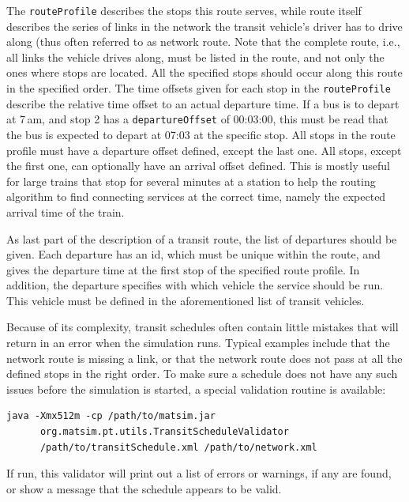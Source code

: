 The \lstinline|routeProfile| describes the stops this route serves, while route itself describes the series of links in the network the transit vehicle's driver has to drive along (thus often referred to as network route. Note that the complete route, i.e.,\,all links the vehicle drives along, must be listed in the route, and not only the ones where stops are located. All the specified stops should occur along this route in the specified order. The time offsets given for each stop in the \lstinline|routeProfile| describe the relative time offset to an actual departure time. If a bus is to depart at 7\,am, and stop 2 has a \lstinline|departureOffset| of 00:03:00, this must be read that the bus is expected to depart at 07:03 at the specific stop. All stops in the route profile must have a departure offset defined, except the last one. All stops, except the first one, can optionally have an arrival offset defined. This is mostly useful for large trains that stop for several minutes at a station to help the routing algorithm to find connecting services at the correct time, namely the expected arrival time of the train.

As last part of the description of a transit route, the list of departures should be given. Each departure has an id, which must be unique within the route, and gives the departure time at the first stop of the specified route profile. In addition, the departure specifies with which vehicle the service should be run. This vehicle must be defined in the aforementioned list of transit vehicles. 

Because of its complexity, transit schedules often contain little mistakes that will return in an error when the simulation runs. Typical examples include that the network route is missing a link, or that the network route does not pass at all the defined stops in the right order. To make sure a schedule does not have any such issues before the simulation is started, a special validation routine is available:

\begin{lstlisting}
java -Xmx512m -cp /path/to/matsim.jar  
      org.matsim.pt.utils.TransitScheduleValidator  
      /path/to/transitSchedule.xml /path/to/network.xml
\end{lstlisting}

If run, this validator will print out a list of errors or warnings, if any are found, or show a message that the schedule appears to be valid. 


